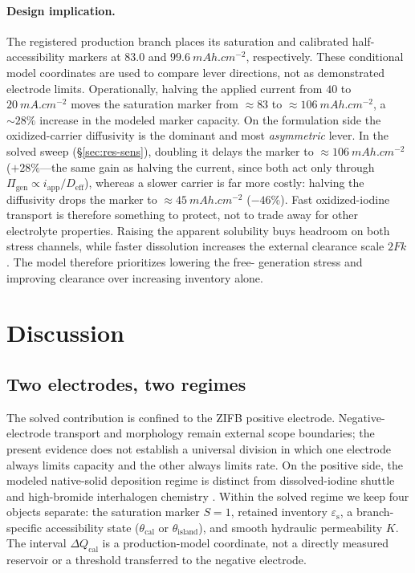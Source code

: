 \documentclass[11pt]{article}
\newcommand{\epss}{\varepsilon_{\mathrm{s}}}
\newcommand{\iapp}{i_{\mathrm{app}}}
\newcommand{\Deff}{D_{\mathrm{eff}}}
\newcommand{\thetacal}{\theta_{\mathrm{cal}}}
\newcommand{\thetaisland}{\theta_{\mathrm{island}}}
\begin{document}
\paragraph{Design implication.} The registered production branch places its saturation and calibrated
half-accessibility markers at $83.0$ and $99.6~\si{mAh.cm^{-2}}$, respectively. These conditional model
coordinates are used to compare lever directions, not as demonstrated electrode limits.
Operationally, halving
the applied current from $40$ to $\SI{20}{mA.cm^{-2}}$ moves the saturation marker from $\approx\!83$ to
$\approx\!\SI{106}{mAh.cm^{-2}}$, a ${\sim}28\%$ increase in the modeled marker capacity. On the
formulation side the oxidized-carrier diffusivity is the dominant and most \emph{asymmetric} lever. In the
solved sweep (\S\ref{sec:res-sens}), doubling it delays the marker to $\approx\!\SI{106}{mAh.cm^{-2}}$
($+28\%$---the same gain as halving the current, since both act only through
$\Pi_{\mathrm{gen}}\propto\iapp/\Deff$), whereas a slower carrier is far more costly: halving the diffusivity
drops the marker to $\approx\!\SI{45}{mAh.cm^{-2}}$ ($-46\%$).
Fast oxidized-iodine transport is therefore something to protect, not to trade away for other electrolyte
properties. Raising the apparent solubility buys headroom on both stress channels, while faster dissolution
increases the external clearance scale $2Fk$ \citep{Zhao2022}. The model therefore prioritizes lowering the
free- generation stress and improving clearance over increasing inventory alone.

\section{Discussion}

\subsection{Two electrodes, two regimes}
\label{sec:scope}
The solved contribution is confined to the ZIFB positive electrode. Negative-electrode transport and
morphology remain external scope boundaries; the present evidence does not establish a universal division in
which one electrode always limits capacity and the other always limits rate. On the positive side, the modeled
native-solid deposition regime is distinct from dissolved-iodine shuttle
\citep{XuZnBr2024,Wei2025} and high-bromide interhalogen chemistry
\citep{Liao2025,HuangIL2025,ChenComplex2026}. Within the solved regime we keep four objects separate:
the saturation marker $S=1$, retained inventory $\epss$, a branch-specific accessibility state
($\thetacal$ or $\thetaisland$), and smooth hydraulic permeability $K$. The interval
$\Delta Q_{\mathrm{cal}}$ is a production-model coordinate, not a directly measured reservoir or a threshold
transferred to the negative electrode.
\end{document}
